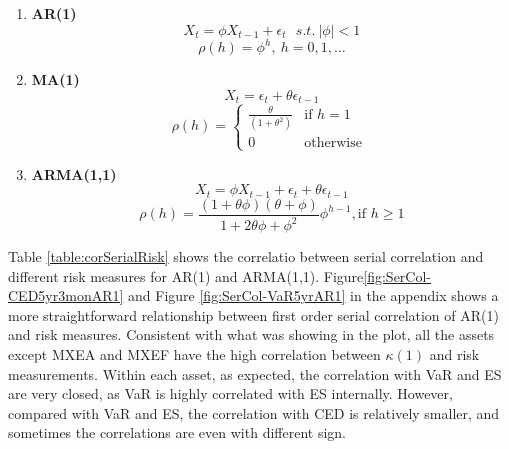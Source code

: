 \documentclass[11pt]{article}
\begin{document}
\begin{enumerate}
\item \textbf{AR(1)}
\begin{equation}
X_t = \phi X_{t-1} + \epsilon_t \ \ \  s.t.\ |\phi | < 1
\end{equation}
\begin{equation}
\rho(h) = \phi ^h, \ h = 0,1,\dots
\end{equation}

\item \textbf{MA(1)}
\begin{equation}
X_t = \epsilon_t + \theta\epsilon_{t-1}
\end{equation}
\begin{equation}
\rho(h) = \begin{cases} \frac{\theta}{(1+\theta^2)} &\mbox{if } h = 1 \\ 
0 & \mbox{otherwise } \end{cases}
\end{equation}

\item \textbf{ARMA(1,1)}
\begin{equation}
X_t = \phi X_{t-1} + \epsilon_t + \theta\epsilon_{t-1}
\end{equation}
\begin{equation}
\rho(h) = \frac{(1+\theta \phi)(\theta + \phi)}{1+ 2\theta \phi +\phi^2} \phi^{h-1}, \mbox{if } h \geq 1
\end{equation}
\end{enumerate}
Table \ref{table:corSerialRisk} shows the correlatio between serial correlation and different risk measures for AR(1) and ARMA(1,1). Figure\ref{fig:SerCol-CED5yr3monAR1} and Figure \ref{fig:SerCol-VaR5yrAR1}
 in the appendix shows a more straightforward relationship between first order serial correlation of AR(1) and risk measures. Consistent with what was showing in the plot, all the assets except MXEA and MXEF have the high correlation between $\kappa(1)$ and risk measurements. Within each asset, as expected, the correlation with VaR and ES are very closed, as VaR is highly correlated with ES internally. However, compared with VaR and ES, the correlation with CED is relatively smaller, and sometimes the correlations are even with different sign.
\end{document}
